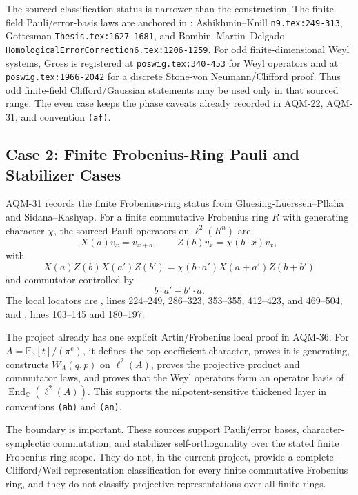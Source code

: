 The sourced classification status is narrower than the construction.  The
finite-field Pauli/error-basis laws are anchored in
: Ashikhmin--Knill
\texttt{n9.tex:249-313}, Gottesman \texttt{Thesis.tex:1627-1681}, and
Bombin--Martin--Delgado \texttt{HomologicalErrorCorrection6.tex:1206-1259}.
For odd finite-dimensional Weyl systems, Gross is registered at
\texttt{poswig.tex:340-453} for Weyl operators and at
\texttt{poswig.tex:1966-2042} for a discrete Stone-von Neumann/Clifford proof.
Thus odd finite-field Clifford/Gaussian statements may be used only in that
sourced range.  The even case keeps the phase caveats already recorded in
AQM-22, AQM-31, and convention \texttt{(af)}.

\subsection{Case 2: Finite Frobenius-Ring Pauli and Stabilizer Cases}

AQM-31 records the finite Frobenius-ring status from
Gluesing-Luerssen--Pllaha and Sidana--Kashyap.  For a finite commutative
Frobenius ring \(R\) with generating character \(\chi\), the sourced Pauli
operators on \(\ell^2(R^n)\) are
\[
  X(a)v_x=v_{x+a},\qquad Z(b)v_x=\chi(b\cdot x)v_x,
\]
with
\[
  X(a)Z(b)X(a')Z(b')
  =
  \chi(b\cdot a')X(a+a')Z(b+b')
\]
and commutator controlled by
\[
  b\cdot a'-b'\cdot a.
\]
The local locators are
,
lines 224--249, 286--323, 353--355, 412--423, and 469--504, and
,
lines 103--145 and 180--197.

The project already has one explicit Artin/Frobenius local proof in AQM-36.
For \(A=\mathbb F_3[t]/(\pi^e)\), it defines the top-coefficient character,
proves it is generating, constructs \(W_A(q,p)\) on \(\ell^2(A)\), proves the
projective product and commutator laws, and proves that the Weyl operators
form an operator basis of \(\operatorname{End}_{\mathbb C}(\ell^2(A))\).
This supports the nilpotent-sensitive thickened layer in conventions
\texttt{(ab)} and \texttt{(an)}.

The boundary is important.  These sources support Pauli/error bases,
character-symplectic commutation, and stabilizer self-orthogonality over the
stated finite Frobenius-ring scope.  They do not, in the current project,
provide a complete Clifford/Weil representation classification for every
finite commutative Frobenius ring, and they do not classify projective
representations over all finite rings.


